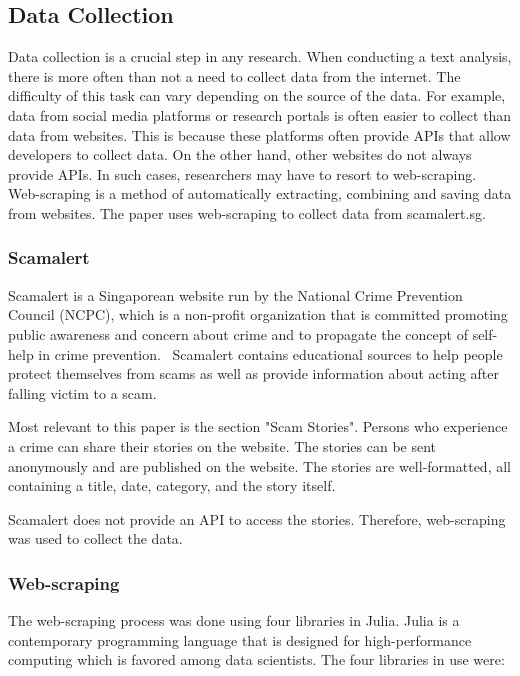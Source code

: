 \subsection{Data Collection}

Data collection is a crucial step in any research. When conducting a text analysis, there is more often than not a need to collect data from the internet. The difficulty of this task can vary depending on the source of the data. For example, data from social media platforms or research portals is often easier to collect than data from websites. This is because these platforms often provide APIs that allow developers to collect data. On the other hand, other websites do not always provide APIs. In such cases, researchers may have to resort to web-scraping. Web-scraping is a method of automatically extracting, combining and saving data from websites. The paper uses web-scraping to collect data from scamalert.sg.

\subsubsection{Scamalert}

Scamalert is a Singaporean website run by the National Crime Prevention Council (NCPC), which is a non-profit organization that is committed promoting public awareness and concern about crime and to propagate the concept of self-help in crime prevention.~\citep{ncpc} Scamalert contains educational sources to help people protect themselves from scams as well as provide information about acting after falling victim to a scam.

Most relevant to this paper is the section "Scam Stories". Persons who experience a crime can share their stories on the website. The stories can be sent anonymously and are published on the website. The stories are well-formatted, all containing a title, date, category, and the story itself.

Scamalert does not provide an API to access the stories. Therefore, web-scraping was used to collect the data. 

\subsubsection{Web-scraping}

The web-scraping process was done using four libraries in Julia. Julia is a contemporary programming language that is designed for high-performance computing which is favored among data scientists. %
The four libraries in use were:

